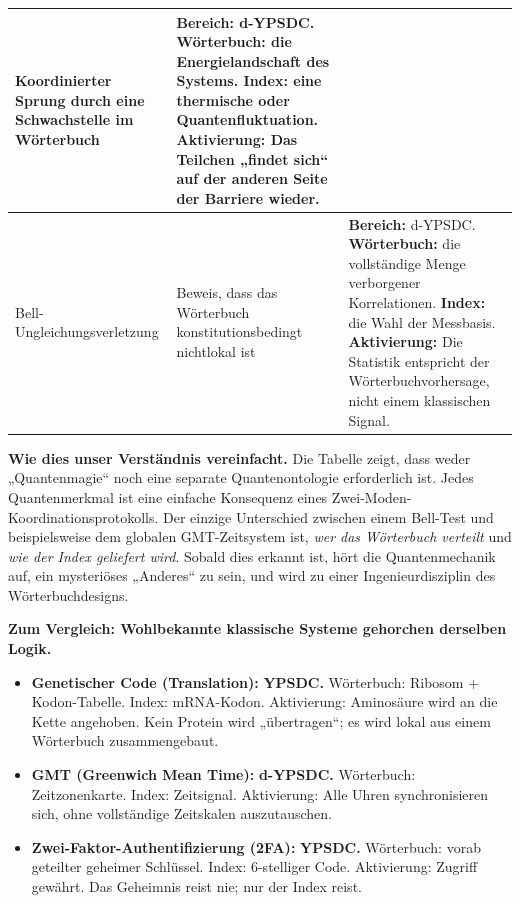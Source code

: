 \documentclass[12pt,a4paper]{article}
\theoremstyle{remark}
\begin{document}
\begin{table}[htbp]
\begin{tabular}{p{2.8cm} p{4.8cm} p{7.8cm}}
			Koordinierter Sprung durch eine Schwachstelle im Wörterbuch &
			\textbf{Bereich:} d-YPSDC. \newline
			\textbf{Wörterbuch:} die Energielandschaft des Systems. \newline
			\textbf{Index:} eine thermische oder Quantenfluktuation. \newline
			\textbf{Aktivierung:} Das Teilchen „findet sich“ auf der anderen Seite der Barriere wieder. \\
			\midrule
			Bell-Ungleichungsverletzung &
			Beweis, dass das Wörterbuch konstitutionsbedingt nichtlokal ist &
			\textbf{Bereich:} d-YPSDC. \newline
			\textbf{Wörterbuch:} die vollständige Menge verborgener Korrelationen. \newline
			\textbf{Index:} die Wahl der Messbasis. \newline
			\textbf{Aktivierung:} Die Statistik entspricht der Wörterbuchvorhersage, nicht einem klassischen Signal. \\
			\bottomrule
		\end{tabular}
	\end{table}
	
	\noindent
	\textbf{Wie dies unser Verständnis vereinfacht.}
	Die Tabelle zeigt, dass weder „Quantenmagie“ noch eine separate Quantenontologie erforderlich ist. Jedes Quantenmerkmal ist eine einfache Konsequenz eines Zwei-Moden-Koordinationsprotokolls. Der einzige Unterschied zwischen einem Bell-Test und beispielsweise dem globalen GMT-Zeitsystem ist, \emph{wer das Wörterbuch verteilt} und \emph{wie der Index geliefert wird}. Sobald dies erkannt ist, hört die Quantenmechanik auf, ein mysteriöses „Anderes“ zu sein, und wird zu einer Ingenieurdisziplin des Wörterbuchdesigns.
	
	\textbf{Zum Vergleich: Wohlbekannte klassische Systeme gehorchen derselben Logik.}
	\begin{itemize}
		\item \textbf{Genetischer Code (Translation):} \textbf{YPSDC.} Wörterbuch: Ribosom + Kodon-Tabelle. Index: mRNA-Kodon. Aktivierung: Aminosäure wird an die Kette angehoben. Kein Protein wird „übertragen“; es wird lokal aus einem Wörterbuch zusammengebaut.
		\item \textbf{GMT (Greenwich Mean Time):} \textbf{d-YPSDC.} Wörterbuch: Zeitzonenkarte. Index: Zeitsignal. Aktivierung: Alle Uhren synchronisieren sich, ohne vollständige Zeitskalen auszutauschen.
		\item \textbf{Zwei-Faktor-Authentifizierung (2FA):} \textbf{YPSDC.} Wörterbuch: vorab geteilter geheimer Schlüssel. Index: 6-stelliger Code. Aktivierung: Zugriff gewährt. Das Geheimnis reist nie; nur der Index reist.
	\end{itemize}
	
\end{document}
